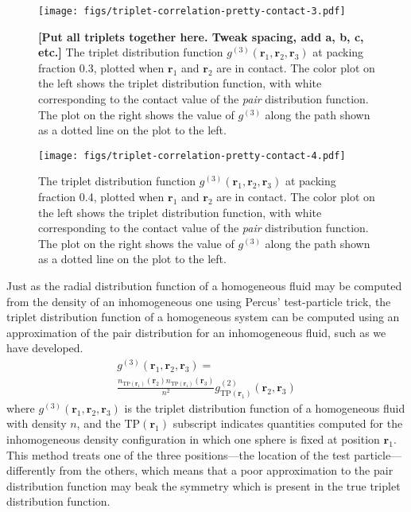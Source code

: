 \documentclass[letterpaper,twocolumn,amsmath,amssymb,pre,aps,10pt]{revtex4-1}
\newcommand{\red}[1]{{\bf \color{red} #1}}
\newcommand{\rr}{\textbf{r}}
\newcommand{\fixme}[1]{\red{[#1]}}
\begin{document}
\begin{figure*}
  \texttt{[image: figs/triplet-correlation-pretty-contact-3.pdf]}
  \caption{\fixme{Put all triplets together here.  Tweak spacing, add a, b, c, etc.} The triplet distribution function
    $g^{(3)}(\rr_1,\rr_2,\rr_3)$ at packing fraction 0.3, plotted when
    $\rr_1$ and $\rr_2$ are in contact.  The color plot on the left
    shows the triplet distribution function, with white corresponding
    to the contact value of the \emph{pair} distribution function.
    The plot on the right shows the value of $g^{(3)}$ along the path
    shown as a dotted line on the plot to the
    left.}\label{fig:triplet-contact-distribution-3}
\end{figure*}
\begin{figure}
  \texttt{[image: figs/triplet-correlation-pretty-contact-4.pdf]}
  \caption{The triplet distribution function
    $g^{(3)}(\rr_1,\rr_2,\rr_3)$ at packing fraction 0.4, plotted when
    $\rr_1$ and $\rr_2$ are in contact.  The color plot on the left
    shows the triplet distribution function, with white corresponding
    to the contact value of the \emph{pair} distribution function.
    The plot on the right shows the value of $g^{(3)}$ along the path
    shown as a dotted line on the plot to the
    left.}\label{fig:triplet-contact-distribution-4}
\end{figure}

Just as the radial distribution function of a homogeneous fluid may be
computed from the density of an inhomogeneous one using Percus'
test-particle trick, the triplet distribution function of a
homogeneous system can be computed using an approximation of the pair
distribution for an inhomogeneous fluid, such as we have developed.
\begin{multline}
    g^{(3)}(\rr_1,\rr_2,\rr_3) =\\
    \frac{n_{\textrm{TP}(\rr_1)}(\rr_2)
      n_{\textrm{TP}(\rr_1)}(\rr_3)}{n^2}
    g^{(2)}_{\textrm{TP}(\rr_1)}(\rr_2,\rr_3)
\end{multline}
where $g^{(3)}(\rr_1,\rr_2,\rr_3)$ is the triplet distribution
function of a homogeneous fluid with density $n$, and the
$\textrm{TP}(\rr_1)$ subscript indicates quantities computed for the
inhomogeneous density configuration in which one sphere is fixed at
position $\rr_1$.  This method treats one of the three positions---the
location of the test particle---differently from the others, which
means that a poor approximation to the pair distribution function may
beak the symmetry which is present in the true triplet distribution
function.
\end{document}
